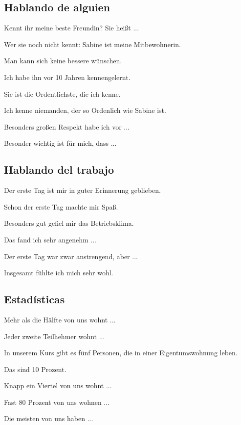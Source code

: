 \subsection{Hablando de alguien}
\begin{myitemize}
\item Kennt ihr meine beste Freundin? Sie heißt ...
\item Wer sie noch nicht kennt: Sabine ist meine Mitbewohnerin.
\item Man kann sich keine bessere wünschen.
\item Ich habe ihn vor 10 Jahren kennengelernt.
\item Sie ist die Ordentlichste, die ich kenne.
\item Ich kenne niemanden, der so Ordenlich wie Sabine ist.
\item Besonders großen Respekt habe ich vor ...
\item Besonder wichtig ist für mich, dass ...
\end{myitemize}

\subsection{Hablando del trabajo}
\begin{myitemize}
\item Der erste Tag ist mir in guter Erinnerung geblieben.
\item Schon der erste Tag machte mir Spaß.
\item Besonders gut gefiel mir das Betriebsklima.
\item Das fand ich sehr angenehm ...
\item Der erste Tag war zwar anstrengend, aber ...
\item Insgesamt fühlte ich mich sehr wohl.
\end{myitemize}

\subsection{Estadísticas}
\begin{myitemize}
\item Mehr als die Hälfte von uns wohnt ...
\item Jeder zweite Teilhehmer wohnt ...
\item In unserem Kurs gibt es fünf Personen, die in einer Eigentumswohnung leben.
\item Das sind 10 Prozent.
\item Knapp ein Viertel von uns wohnt ...
\item Fast 80 Prozent von uns wohnen ...
\item Die meisten von uns haben ...
\end{myitemize}

